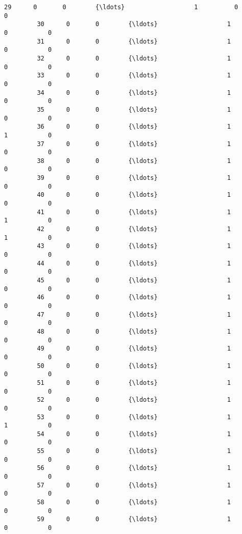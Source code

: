 \documentclass[11pt]{article}
\begin{document}
\begin{Verbatim}[commandchars=\\\{\}]
         29      0       0        {\ldots}                   1          0           0   
         30      0       0        {\ldots}                   1          0           0   
         31      0       0        {\ldots}                   1          0           0   
         32      0       0        {\ldots}                   1          0           0   
         33      0       0        {\ldots}                   1          0           0   
         34      0       0        {\ldots}                   1          0           0   
         35      0       0        {\ldots}                   1          0           0   
         36      0       0        {\ldots}                   1          1           0   
         37      0       0        {\ldots}                   1          0           0   
         38      0       0        {\ldots}                   1          0           0   
         39      0       0        {\ldots}                   1          0           0   
         40      0       0        {\ldots}                   1          0           0   
         41      0       0        {\ldots}                   1          1           0   
         42      0       0        {\ldots}                   1          1           0   
         43      0       0        {\ldots}                   1          0           0   
         44      0       0        {\ldots}                   1          0           0   
         45      0       0        {\ldots}                   1          0           0   
         46      0       0        {\ldots}                   1          0           0   
         47      0       0        {\ldots}                   1          0           0   
         48      0       0        {\ldots}                   1          0           0   
         49      0       0        {\ldots}                   1          0           0   
         50      0       0        {\ldots}                   1          0           0   
         51      0       0        {\ldots}                   1          0           0   
         52      0       0        {\ldots}                   1          0           0   
         53      0       0        {\ldots}                   1          1           0   
         54      0       0        {\ldots}                   1          0           0   
         55      0       0        {\ldots}                   1          0           0   
         56      0       0        {\ldots}                   1          0           0   
         57      0       0        {\ldots}                   1          0           0   
         58      0       0        {\ldots}                   1          0           0   
         59      0       0        {\ldots}                   1          0           0   
         

\end{Verbatim}
\end{document}

